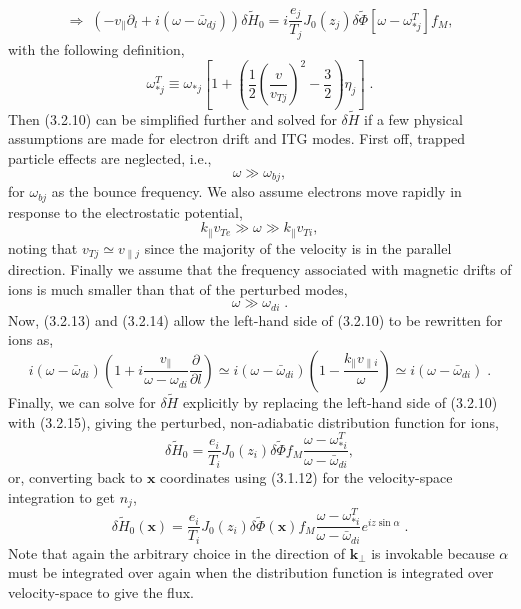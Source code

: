 \documentclass[12pt]{article}
\numberwithin{equation}{subsection}
\begin{document}
   \begin{equation}
      \Rightarrow\; (-v_\parallel\partial_l + i(\omega - \bar{\omega}_{dj}))\delta\widetilde{H}_0
      = i\frac{e_j}{T_j}J_0(z_j)\delta\widetilde{\Phi}[\omega - \omega_{*j}^T]f_M,
   \end{equation}
with the following definition,
   \begin{equation}
      \omega_{*j}^T \equiv \omega_{*j}[1 + (\frac{1}{2}\left(\frac{v}{v_{Tj}}\right)^2-\frac{3}{2})\eta_j]\;.
   \end{equation}
Then (3.2.10) can be simplified further and solved for $\delta\widetilde{H}$ if a few physical assumptions are made for electron drift and ITG modes.
First off, trapped particle effects are neglected, i.e.,
   \begin{equation}
      \omega \gg \omega_{bj},
   \end{equation}
for $\omega_{bj}$ as the bounce frequency. We also assume electrons move rapidly in response to the electrostatic potential,
   \begin{equation}
      k_\parallel v_{Te} \gg \omega \gg k_\parallel v_{Ti},
   \end{equation}
noting that $v_{Tj} \simeq v_{\parallel j}$ since the majority of the velocity is in the parallel direction. Finally we assume that the frequency
associated with magnetic drifts of ions is much smaller than that of the perturbed modes,
   \begin{equation}
      \omega \gg \omega_{di}\;.
   \end{equation}
Now, (3.2.13) and (3.2.14) allow the left-hand side of (3.2.10) to be rewritten for ions as,
   \begin{equation}
      i(\omega-\bar{\omega}_{di})(1+i\frac{v_\parallel}{\omega-\omega_{di}}\frac{\partial}{\partial l}) \simeq
      i(\omega-\bar{\omega}_{di})(1-\frac{k_\parallel v_{\parallel i}}{\omega}) \simeq i(\omega-\bar{\omega}_{di})\;.
   \end{equation}
Finally, we can solve for $\delta\widetilde{H}$ explicitly by replacing the left-hand side of (3.2.10) with (3.2.15), giving
the perturbed, non-adiabatic distribution function for ions,
   \begin{equation}
      \delta\widetilde{H}_0 = \frac{e_i}{T_i}J_0(z_i)\delta\widetilde{\Phi}
                                      f_M\frac{\omega-\omega_{*i}^T}{\omega-\bar{\omega}_{di}},
   \end{equation}
or, converting back to $\bm{x}$ coordinates using (3.1.12) for the velocity-space integration to get $n_j$,
   \begin{equation}
      \delta\widetilde{H}_0(\bm{x}) = \frac{e_i}{T_i}J_0(z_i)\delta\widetilde{\Phi}(\bm{x})
                                      f_M\frac{\omega-\omega_{*i}^T}{\omega-\bar{\omega}_{di}}e^{iz\sin\alpha}\;.
   \end{equation}
Note that again the arbitrary choice in the direction of $\bm{k}_\perp$ is invokable because $\alpha$ must be
integrated over again when the distribution function is integrated over velocity-space to give the flux.
\end{document}
